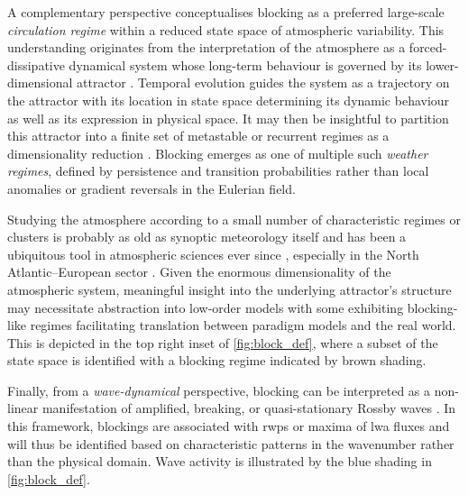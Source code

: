A complementary perspective conceptualises blocking as a preferred large-scale
\emph{circulation regime} within a reduced state space of atmospheric
variability.
This understanding originates from the interpretation of the atmosphere as a
forced-dissipative dynamical system whose long-term behaviour is governed by
its lower-dimensional attractor \parencite[e.g.,~][]{
    dijkstraNonlinearClimateDynamics2013,weilandIntransitiveAtmosphereDynamics2021,
    strommenTopologicalPerspectiveWeather2023, ghilReviewArticleDynamical2023}.
Temporal evolution guides the system as a trajectory on the attractor with
its location in state space determining its dynamic behaviour as well as its
expression in physical space. It may then be insightful to partition this
attractor into a finite set of metastable or recurrent regimes as a
dimensionality reduction \parencite{michelangeliWeatherRegimesRecurrence1995,
    badzaIdentifyingOnsetDecay2024}.
Blocking emerges as one of multiple such \emph{weather regimes}, defined by
persistence and transition probabilities rather than local anomalies or
gradient reversals in the Eulerian field.

Studying the atmosphere according to a small number of characteristic regimes
or clusters is probably as old as synoptic meteorology itself and has been a
ubiquitous tool in atmospheric sciences ever since \parencite{
    hannachiLowFrequencyNonlinearity2017}, especially in the North
Atlantic--European sector \parencite[e.g.,~][]{
    vautardMultipleWeatherRegimes1990,nealFlexibleApproachDefining2016,
    gramsLifeCycleDefinition2026}. Given the enormous dimensionality of the
atmospheric system, meaningful insight into the underlying attractor's
structure may necessitate abstraction into low-order models with some
exhibiting blocking-like regimes \parencite{
    crommelinMechanismAtmosphericRegime2004,
    kallenBifurcationPropertiesQuasigeostrophic1982,
    lucariniNewMathematicalFramework2020} facilitating translation between
paradigm models and the real world. This is depicted in the top right inset of
\cref{fig:block_def}, where a subset of the state space is identified with
a blocking regime indicated by brown shading.

Finally, from a \emph{wave-dynamical} perspective, blocking can be interpreted as a
non-linear manifestation of amplified, breaking, or quasi-stationary
Rossby waves \parencite{tungTheoryStationaryLong1979,
    nakamuraAtmosphericBlockingTraffic2018}. In this framework, blockings are
associated with \glspl{rwp} \parencite{wirthRossbyWavePackets2018}
or maxima of \gls{lwa} fluxes \parencite{huangLocalFiniteamplitudeWave2016}
and will thus be identified based on characteristic
patterns in the wavenumber rather than the physical domain. Wave activity is
illustrated by the blue shading in \cref{fig:block_def}.

